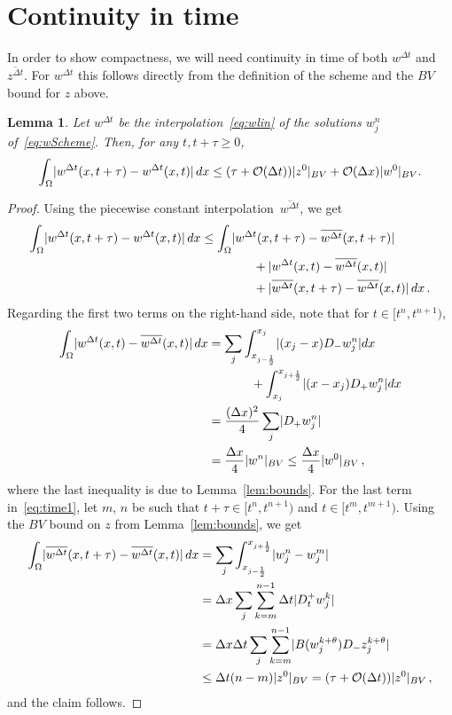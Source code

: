 \documentclass[11pt,leqno]{amsart}
\newtheorem{lemma}{Lemma}[section]
\newcommand{\Dtp}{D_t^+}
\newcommand{\Dp}{D_+}
\newcommand{\Dm}{D_-}
\newcommand{\normBV}[1]{\abs{#1}_{BV}}
\newcommand{\wlin}{w^{\Delta t}}
\newcommand{\wcon}{\overline{w^{\Delta t}}}
\newcommand{\zcon}{\overline{z^{\Delta t}}}
\DeclarePairedDelimiter\abs{\lvert}{\rvert}
\begin{document}
\section{Continuity in time}\label{sec:time}
In order to show compactness, we will need continuity in time of both $\wlin$ and $\zcon$. For $\wlin$ this follows directly from the definition of the scheme and the $BV$ bound for $z$ above. %
\begin{lemma}\label{lem:wtime}
Let $\wlin$ be the interpolation~\eqref{eq:wlin} of the solutions $w^n_j$ of~\eqref{eq:wScheme}. Then, for any $t,t+\tau\ge 0$, 
\begin{equation*}
  \int_\Omega \abs{\wlin(x,t+\tau)-\wlin(x,t)} \,dx\le (\tau + \mathcal{O}(\Delta t))\normBV{z^0}+ \mathcal{O}(\Delta x)\normBV{w^0}.
\end{equation*}
\end{lemma}
\begin{proof}
Using the piecewise constant interpolation~$\wcon$, we get
\begin{align}
  \int_\Omega \abs{\wlin(x,t+\tau)-\wlin(x,t)}\,dx &\le \int_\Omega \abs{\wlin(x,t+\tau)-\wcon(x,t+\tau)} \nonumber \\&\hphantom{\le\int_\Omega}\qquad{}+ \abs{\wlin(x,t)-\wcon(x,t)} \label{eq:time1} \\&\hphantom{\le\int_\Omega}\qquad{}+ \abs{\wcon(x,t+\tau)-\wcon(x,t)}\,dx\,.\nonumber
\end{align}
Regarding the first two terms on the right-hand side, note that for $t\in[t^n,t^{n+1})$,
\begin{equation}\label{eq:wconDiff}
  \begin{split}
  \int_\Omega \abs{\wlin(x,t)-\wcon(x,t)}\,dx&=\sum_j\int_{x_{j-\frac{1}{2}}}^{x_j} \abs{(x_j-x)\Dm w^n_j } dx\\&\hphantom{\sum_j}\qquad{}+ \int_{x_j}^{x_{j+\frac{1}{2}}} \abs{(x-x_j)\Dp w^n_j } dx\\
&= \frac{(\Delta x)^2}{4} \sum_j \abs{\Dp w^n_j}\\
                                   &=\frac{\Delta x}{4} \normBV{ w^n} \le \frac{\Delta x}{4} \normBV{w^0}\,,      
  \end{split}
\end{equation}
where the last inequality is due to Lemma~\ref{lem:bounds}.
For the last term in~\eqref{eq:time1}, let $m$, $n$ be such that $t+\tau\in [t^n,t^{n+1})$ and $t\in[t^m,t^{m+1})$. Using the $BV$ bound on $z$ from Lemma~\ref{lem:bounds}, we get
\begin{align*}
  \int_\Omega \abs{\wcon(x,t+\tau)-\wcon(x,t)}\,dx&=\sum_j \int_{x_{j-\frac{1}{2}}}^{x_{j+\frac{1}{2}}}\abs{w^n_j - w^m_j}\\
&=\Delta x \sum_j \sum_{k=m}^{n-1} \Delta t \abs{\Dtp w^k_j}\\
&=\Delta x \Delta t \sum_j \sum_{k=m}^{n-1} \abs{B(w^{k+\theta}_j) \Dm z^{k+\theta}_j}\\
&\le \Delta t (n-m) \normBV{z^0}= (\tau + \mathcal{O}(\Delta t)) \normBV{z^0}\,,
\end{align*}
and the claim follows.
\end{proof}
\end{document}
